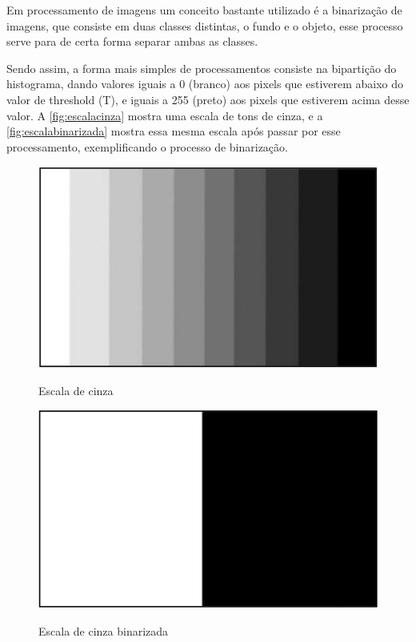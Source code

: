 Em processamento de imagens um conceito bastante utilizado é a binarização de
imagens, que consiste em duas classes distintas, o fundo e o objeto, esse processo 
serve para de certa forma separar ambas as classes.

Sendo assim, a forma mais simples de processamentos consiste na
bipartição do histograma, dando valores iguais a 0 (branco) aos pixels que estiverem
abaixo do valor de threshold (T), e iguais a 255 (preto) aos pixels que estiverem 
acima desse valor. A \autoref{fig:escalacinza} mostra uma escala de tons 
de cinza, e a \autoref{fig:escalabinarizada} mostra essa mesma escala após passar 
por esse processamento, exemplificando o processo de binarização.

\begin{figure}[h!]
    \centering
    \caption{Escala de cinza}
    \includegraphics[scale=0.25]{figuras/escala_cinza.png} 
    \fonte{}%
    \label{fig:escalacinza}
    \centering
\end{figure}

\begin{figure}[h!]
    \centering
    \caption{Escala de cinza binarizada}
    \includegraphics[scale=0.25]{figuras/escala_binarizada.png} 
    \fonte{}%
    \label{fig:escalabinarizada}
    \centering
\end{figure}


